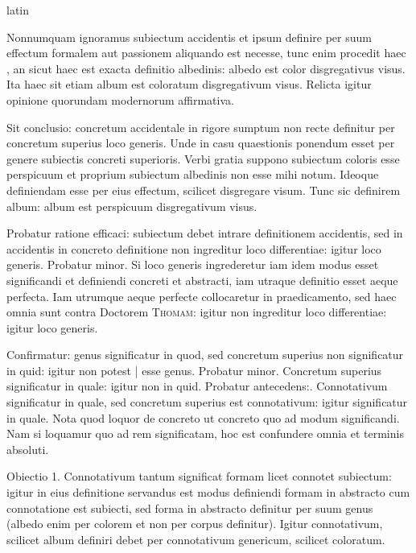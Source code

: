 \begin{otherlanguage*}{latin}
        \pstart
        \pend
      
\pstart
  Nonnumquam ignoramus subiectum accidentis et ipsum definire per suum effectum formalem aut passionem aliquando est necesse, tunc  enim procedit haec , an sicut haec est exacta definitio albedinis: albedo est color disgregativus visus. Ita haec sit etiam album est coloratum disgregativum visus. Relicta igitur opinione quorundam modernorum affirmativa. 
\pend

\pstart
  Sit conclusio: concretum accidentale in rigore sumptum non recte definitur per concretum superius loco generis. Unde in casu quaestionis ponendum esset per genere subiectis concreti superioris. Verbi gratia suppono subiectum coloris esse perspicuum et proprium subiectum albedinis non esse mihi notum. Ideoque definiendam esse per eius effectum, scilicet disgregare visum. Tunc sic definirem album: album est perspicuum disgregativum visus. 
\pend

\pstart
  Probatur ratione efficaci: subiectum debet intrare definitionem accidentis, sed in accidentis in concreto definitione non ingreditur loco differentiae: igitur loco generis. Probatur minor. Si loco generis ingrederetur iam idem modus esset significandi et definiendi concreti et abstracti, iam utraque definitio esset aeque perfecta. Iam utrumque aeque perfecte collocaretur in praedicamento, sed haec omnia sunt contra Doctorem \textsc{Thomam}: igitur non ingreditur loco differentiae: igitur loco generis. 
\pend

\pstart
  Confirmatur: genus significatur in quod, sed concretum superius non significatur in quid: igitur non potest \textnormal{|}   esse genus. Probatur minor. Concretum superius significatur in quale: igitur non in quid. Probatur antecedens:. Connotativum significatur in quale, sed concretum superius est connotativum: igitur significatur in quale. Nota quod loquor de concreto ut concreto quo ad modum significandi. Nam si loquamur quo ad rem significatam, hoc est confundere omnia et terminis absoluti. 
\pend

\pstart
  Obiectio 1. Connotativum tantum significat formam licet connotet subiectum: igitur in eius definitione servandus est modus definiendi formam in abstracto cum connotatione est subiecti, sed forma in abstracto definitur per suum genus (albedo enim per colorem et non per corpus definitur). Igitur connotativum, scilicet album definiri debet per connotativum genericum, scilicet coloratum. 
\pend


\end{otherlanguage*}
